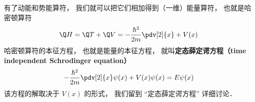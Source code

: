 有了动能和势能算符， 我们就可以把它们相加得到（一维）能量算符， 也就是哈密顿算符
\begin{equation}
\Q H = \Q T + \Q V = -\frac{\hbar^2}{2m} \pdv[2]{x} + V(x)
\end{equation}
哈密顿算符的本征方程， 也就是能量的本征方程， 就叫\textbf{定态薛定谔方程（time independent Schrodinger equation）}
\begin{equation}
-\frac{\hbar^2}{2m} \pdv[2]{x}\psi(x) + V(x)\psi(x) = E\psi(x)
\end{equation}
该方程的解取决于 $V(x)$ 的形式， 我们留到 “定态薛定谔方程” 详细讨论．

